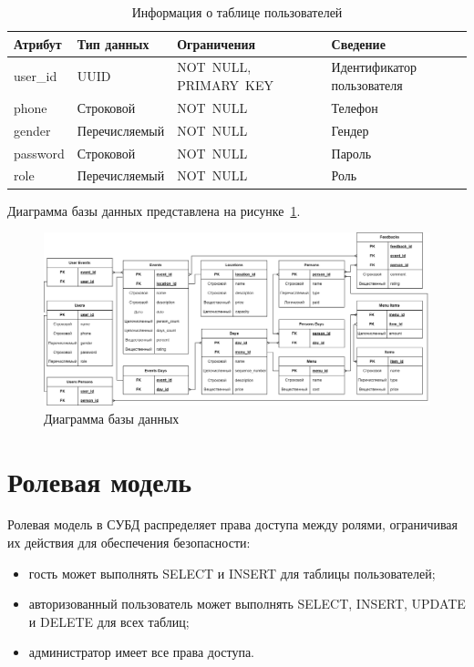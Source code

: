 \begin{table}[h!]
	\centering
	\caption{Информация о таблице пользователей}
	\begin{tabularx}{\textwidth}{|p{2.6cm}|X|p{6cm}|X|}
		\hline
		\textbf{Атрибут} & \textbf{Тип данных} & \textbf{Ограничения} & \textbf{Сведение} \\
		\hline
		user\_id & UUID & NOT~NULL, \newline PRIMARY~KEY & Идентификатор пользователя \\
		\hline
		phone & Строковой & NOT~NULL & Телефон \\
		\hline
		gender & Перечисляемый & NOT~NULL & Гендер \\
		\hline
		password & Строковой & NOT~NULL & Пароль \\
		\hline
		role & Перечисляемый & NOT~NULL & Роль \\
		\hline
	\end{tabularx}
	\label{tbl:users}
\end{table}

\newpage

Диаграмма базы данных представлена на рисунке~\ref{fig:db-diagram-notypes}.

\begin{figure}[h!]
	\centering
	\includegraphics[width=1\textwidth]{images/db-diagram-notypes.png}
	\caption{Диаграмма базы данных} 
	\label{fig:db-diagram-notypes} 
\end{figure}

\section{Ролевая модель}

Ролевая модель в СУБД распределяет права доступа между ролями, ограничивая их действия для обеспечения безопасности:
\begin{itemize}[label=--]
	\item гость может выполнять SELECT и INSERT для таблицы пользователей;
	\item авторизованный пользователь может выполнять SELECT, INSERT, \newline UPDATE и DELETE для всех таблиц;
	\item администратор имеет все права доступа.
\end{itemize}

